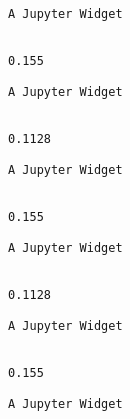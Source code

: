 \documentclass[11pt]{article}
\begin{document}
    
    \begin{verbatim}
A Jupyter Widget
    \end{verbatim}

    
    \begin{Verbatim}[commandchars=\\\{\}]

0.155

    \end{Verbatim}

    
    \begin{verbatim}
A Jupyter Widget
    \end{verbatim}

    
    \begin{Verbatim}[commandchars=\\\{\}]

0.1128

    \end{Verbatim}

    
    \begin{verbatim}
A Jupyter Widget
    \end{verbatim}

    
    \begin{Verbatim}[commandchars=\\\{\}]

0.155

    \end{Verbatim}

    
    \begin{verbatim}
A Jupyter Widget
    \end{verbatim}

    
    \begin{Verbatim}[commandchars=\\\{\}]

0.1128

    \end{Verbatim}

    
    \begin{verbatim}
A Jupyter Widget
    \end{verbatim}

    
    \begin{Verbatim}[commandchars=\\\{\}]

0.155

    \end{Verbatim}

    
    \begin{verbatim}
A Jupyter Widget
    \end{verbatim}
\end{document}
